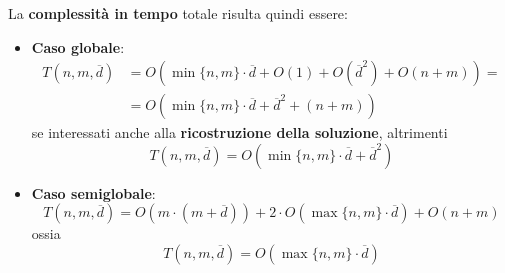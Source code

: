    \vspace{20pt}
    La \textbf{complessità in tempo} totale risulta quindi essere:
    \begin{itemize}
        \item \textbf{Caso globale}:
        \begin{align*}
            T(n, m, \overline{d}) &= O(\min\{n, m\} \cdot \overline{d} + O(1) + O(\overline{d}^2) + O(n + m)) = \\
                                  &= O(\min\{n, m\} \cdot \overline{d} + \overline{d}^2 + (n + m))
        \end{align*}
        se interessati anche alla \textbf{ricostruzione della soluzione}, altrimenti
        \begin{equation}
            T(n, m, \overline{d}) = O(\min\{n, m\} \cdot \overline{d} + \overline{d}^2)
            \label{equation:wfa_global_time_complexity}
        \end{equation}
        \item \textbf{Caso semiglobale}:
        \begin{equation*}
            T(n, m, \overline{d}) = O(m \cdot (m + \overline{d})) + 2 \cdot O( \max\{n, m\} \cdot \overline{d}) + O(n + m)
        \end{equation*}
        ossia
        \begin{equation}
            T(n, m, \overline{d}) = O(\max\{n, m\} \cdot \overline{d})
             \label{equation:wfa_semiglobal_time_complexity}
        \end{equation}
    \end{itemize}


